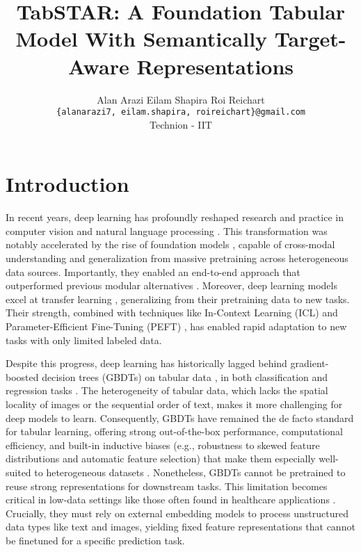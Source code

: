 \documentclass{article}
\title{TabSTAR: A Foundation Tabular Model With Semantically Target-Aware Representations}
\author{%
  Alan Arazi \quad Eilam Shapira \quad Roi Reichart \\
  \texttt{\{alanarazi7, eilam.shapira, roireichart\}@gmail.com} \\ Technion - IIT
}
\begin{document}
\maketitle


\begin{abstract}
  
  
\end{abstract}

\section{Introduction} \label{sec:introduction}

In recent years, deep learning has profoundly reshaped research and practice in computer vision \cite{krizhevsky_imagenet_2012, simonyan_very_2015, he_deep_2015, dosovitskiy_image_2021} and natural language processing \cite{mikolov_efficient_2013, bahdanau_neural_2016, vaswani_attention_2017, devlin_bert_2019, brown_language_2020}. This transformation was notably accelerated by the rise of foundation models \cite{bommasani_opportunities_2021, zhou_comprehensive_2023, awais_foundation_2025}, capable of cross-modal understanding and generalization from massive pretraining across heterogeneous data sources. Importantly, they enabled an end-to-end approach that outperformed previous modular alternatives \cite{sutskever_sequence_2014, amodei_deep_2016}. Moreover, deep learning models excel at transfer learning \cite{zhuang_comprehensive_2021}, generalizing from their pretraining data to new tasks. Their strength, combined with techniques like In-Context Learning (ICL) \cite{brown_language_2020} and Parameter-Efficient Fine-Tuning (PEFT) \cite{houlsby_parameter-efficient_2019}, has enabled rapid adaptation to new tasks with only limited labeled data.

Despite this progress, deep learning has historically lagged behind gradient-boosted decision trees (GBDTs) on tabular data \cite{breiman_random_2001, chen_xgboost_2016, prokhorenkova_catboost_2018}, in both classification and regression tasks \cite{shwartz-ziv_tabular_2022, borisov_deep_2024, grinsztajn_why_2022, mcelfresh_when_2023}. The heterogeneity of tabular data, which lacks the spatial locality of images or the sequential order of text, makes it more challenging for deep models to learn. Consequently, GBDTs have remained the de facto standard for tabular learning, offering strong out-of-the-box performance, computational efficiency, and built-in inductive biases (e.g., robustness to skewed feature distributions and automatic feature selection) that make them especially well-suited to heterogeneous datasets \cite{grinsztajn_why_2022}. Nonetheless, GBDTs cannot be pretrained to reuse strong representations for downstream tasks. This limitation becomes critical in low-data settings like those often found in healthcare applications \cite{levin_transfer_2022}. Crucially, they must rely on external embedding models to process unstructured data types like text and images, yielding fixed feature representations that cannot be finetuned for a specific prediction task. 
\end{document}
